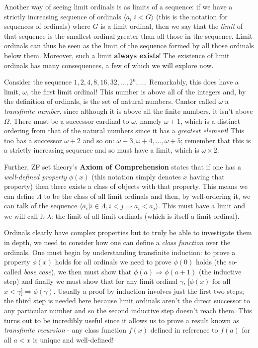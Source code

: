 Another way of seeing limit ordinals is as limits of a sequence: if we have a strictly increasing sequence of ordinals \(\langle a_i | i < G \rangle\) (this is the notation for sequences of ordinals) where \(G\) is a limit ordinal, then we say that the \textit{limit} of that sequence is the smallest ordinal greater than all those in the sequence. Limit ordinals can thus be seen as the limit of the sequence formed by all those ordinals below them. Moreover, such a limit \textbf{always exists}! The existence of limit ordinals has many consequences, a few of which we will explore now.

Consider the sequence \(1, 2, 4, 8, 16, 32, ..., 2^n, ...\). Remarkably, this does have a limit, \textbf{\(\omega\)}, the first limit ordinal! This number is above all of the integers and, by the definition of ordinals, is the set of natural numbers. Cantor called \(\omega\) a \textit{transfinite number}, since although it is above all the finite numbers, it isn't above \(\Omega\). There must be a successor cardinal to \(\omega\), namely \(\omega + 1\), which is a distinct ordering from that of the natural numbers since it has a \textit{greatest element}! This too has a successor \( \omega + 2\) and so on: \( \omega + 3, \omega+4, ..., \omega +5\); remember that this is a strictly increasing sequence and so must have a limit, which is \( \omega\times{}2\).

Further, ZF set theory's \textbf{Axiom of Comprehension} states that if one has a \textit{well-defined property} \( \phi (x) \) (this notation simply denotes \(x\) having that property) then there exists a class of objects with that property. This means we can define \( \Lambda \) to be the class of all limit ordinals and then, by well-ordering it, we can talk of the sequence \(\langle a_i | i \in \Lambda, i < j \Rightarrow a_i < a_j \rangle\). This must have a limit and we will call it \( \lambda\): the limit of all limit ordinals (which is itself a limit ordinal).

Ordinals clearly have complex properties but to truly be able to investigate them in depth, we need to consider how one can define a \textit{class function} over the ordinals. One must begin by understanding transfinite induction: to prove a property \( \phi(x)\) holds for all ordinals we need to prove \(\phi(0)\) holds (the so-called \textit{base case}), we then must show that \(\phi(a) \Rightarrow \phi (a+1) \) (the inductive step) and finally we must show that for any limit ordinal \(\gamma\), \([\phi(x)\) for all \(x<\gamma] \Rightarrow \phi(\gamma)\). Usually a proof by induction involves just the first two steps; the third step is needed here because limit ordinals aren't the direct successor to any particular number and so the second inductive step doesn't reach them. This turns out to be incredibly useful since it allows us to prove a result known as \textit{transfinite recursion} - any class function \(f(x)\) defined in reference to \(f(a)\) for all \(a<x\) is unique and well-defined!

